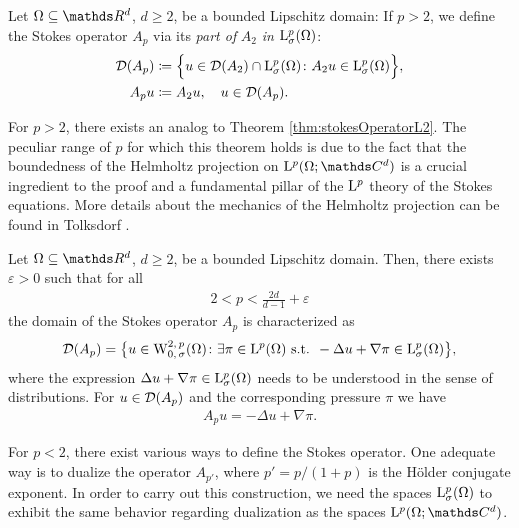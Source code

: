 \begin{defn}
  \label{defn:stokeslp}
  Let $\Omega\subseteq \R^d$, $d \geq 2$, be a bounded Lipschitz domain:
  If $p > 2$, we define the Stokes operator $A_p$ via its \emph{part of} $A_2$ \emph{in } $\mathrm{L}^p_\sigma(\Omega)$:
  \begin{align*}
    \mathcal{D}(A_p) &\coloneqq \Big\{ u \in \mathcal{D}(A_2) \cap \mathrm{L}^p_\sigma(\Omega) \colon A_2 u \in \mathrm{L}^p_\sigma(\Omega) \Big\}, \\
    A_p u &\coloneqq A_2 u, \quad u \in \mathcal{D}(A_p).
  \end{align*}
\end{defn}

For $p > 2$, there exists an analog to Theorem \ref{thm:stokesOperatorL2}. The peculiar range of $p$ for which this theorem holds is due to the fact that the boundedness of the Helmholtz projection on $\Ell^p(\Omega; \C^d)$ is a crucial ingredient to the proof and a fundamental pillar of the $\mathrm{L}^p$ theory of the Stokes equations.
More details about the mechanics of the Helmholtz projection can be found in Tolksdorf \cite[Sec. 5.1]{tolksdorf}.

\begin{thm}
  \label{thm:domainStokesOperatorLp}
  Let $\Omega \subseteq \R^d$, $d \geq 2$, be a bounded Lipschitz domain.
  Then, there exists $\varepsilon > 0$ such that for all
  \begin{align*}
    2 < p < \frac{2d}{d - 1} + \varepsilon
  \end{align*}
  the domain of the Stokes operator $A_p$ is characterized as
  \begin{align*}
    \mathcal{D}(A_p) = \big\{ u \in \mathrm{W}^{2,\,p}_{0,\,\sigma}(\Omega) \colon \exists \pi \in \mathrm{L}^p(\Omega) \text{ s.t. } -\Delta u + \nabla \pi \in \mathrm{L}^p_\sigma(\Omega) \big\},
  \end{align*}
  where the expression $\Delta u + \nabla \pi \in\mathrm{L}^p_\sigma(\Omega)$ needs to be understood in the sense of distributions.
  For $u \in \mathcal{D}(A_p)$ and the corresponding pressure $\pi$ we have
  \begin{align*}
    A_p u = -\Delta u + \nabla \pi.
  \end{align*}
\end{thm}

For $p < 2$, there exist various ways to define the Stokes operator.
One adequate way is to dualize the operator $A_{p'}$, where $p' = p / (1 + p)$ is the Hölder conjugate exponent.
In order to carry out this construction, we need the spaces $\mathrm{L}^p_\sigma(\Omega)$ to exhibit the same behavior regarding dualization as the spaces $\Ell^p(\Omega; \C^d)$.

